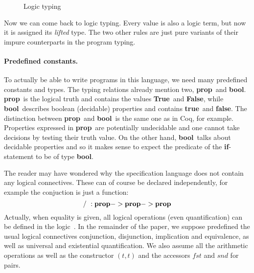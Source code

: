 \documentclass[a4paper]{llncs}
\newcommand{\letml}{{\bf let}}
\newcommand{\inml}{{\bf in}}
\newcommand{\ifml}{{\bf if}}
\newcommand{\thenml}{{\bf then}}
\newcommand{\elseml}{{\bf else}}
\newcommand{\propml}{{\bf prop}}
\newcommand{\boolml}{{\bf bool}}
\newcommand{\alist}[1]{\overline{#1} }
\newcommand{\Trueml}{{\bf True}}
\newcommand{\Falseml}{{\bf False}}
\newcommand{\trueml}{{\bf true}}
\newcommand{\falseml}{{\bf false}}
\newcommand{\coq}{Coq}
\newcommand{\ceil}[1]{\lceil #1 \rceil}
\begin{document}
\begin{figure}[htbp]
  \caption{Logic typing}
  \label{fig:logictyping}
\end{figure}

Now we can come back to logic typing. Every value is also a logic term,
but now it is assigned its {\em lifted} type. The two other rules are just 
pure variants of their impure counterparts in the program typing.

\paragraph{Predefined constants.}

To actually be able to write programs in this language, we need many
predefined constants and types. The typing relations already mention two,
\propml\ and \boolml. \propml\ is the logical truth and contains the values
\Trueml\ and \Falseml, while \boolml\ describes boolean (decidable) properties
and contains \trueml\ and \falseml. The distinction between \propml\ and
\boolml\ is the same one as in \coq, for example. Properties expressed in
\propml\ are potentially undecidable and one cannot take decisions by testing
their truth value. On the other hand, \boolml\ talks about decidable
properties and so it makes sense to expect the predicate of the
\ifml-statement to be of type \boolml.

The reader may have wondered why the specification language does not contain
any logical connectives. These can of course be declared independently, for
example the conjuction is just a function: \begin{equation*} /\ :  \propml ->
\propml -> \propml \end{equation*} Actually, when equality is given, all
logical operations (even quantification) can be defined in the
logic~\cite{andrews86}.  In the remainder of the paper, we suppose
predefined the usual logical connectives conjunction, disjunction,
implication and equivalence, as well as universal and existential
quantification. We also assume all the arithmetic operations as well as the
constructor $(t,t)$  and the accessors $fst$ and $snd$ for pairs. 
\end{document}
